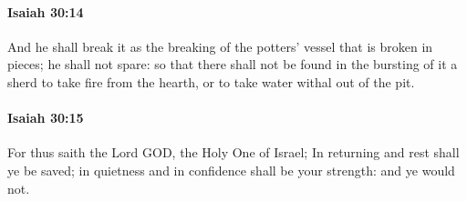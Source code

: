 		\paragraph{Isaiah 30:14} %
			\label{ISAIAH-30-14}

			And he shall break it as the breaking of the potters' vessel that is broken in pieces; he shall not spare: so that there shall not be found in the bursting of it a sherd to take fire from the hearth, or to take water withal out of the pit.


		\paragraph{Isaiah 30:15} %
			\label{ISAIAH-30-15}

			For thus saith the Lord GOD, the Holy One of Israel; In returning and rest shall ye be saved; in quietness and in confidence shall be your strength: and ye would not.

